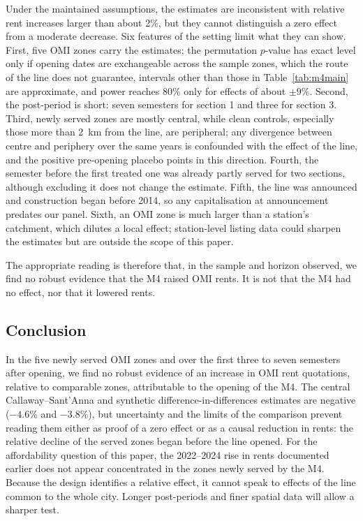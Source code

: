 Under the maintained assumptions, the estimates are inconsistent with relative rent increases larger than about 2\%, but they cannot distinguish a zero effect from a moderate decrease. Six features of the setting limit what they can show. First, five OMI zones carry the estimates; the permutation $p$-value has exact level only if opening dates are exchangeable across the sample zones, which the route of the line does not guarantee, intervals other than those in Table~\ref{tab:m4main} are approximate, and power reaches 80\% only for effects of about $\pm9\%$. Second, the post-period is short: seven semesters for section 1 and three for section 3. Third, newly served zones are mostly central, while clean controls, especially those more than 2~km from the line, are peripheral; any divergence between centre and periphery over the same years is confounded with the effect of the line, and the positive pre-opening placebo points in this direction. Fourth, the semester before the first treated one was already partly served for two sections, although excluding it does not change the estimate. Fifth, the line was announced and construction began before 2014, so any capitalisation at announcement predates our panel. Sixth, an OMI zone is much larger than a station's catchment, which dilutes a local effect; station-level listing data could sharpen the estimates but are outside the scope of this paper.

The appropriate reading is therefore that, in the sample and horizon observed, we find no robust evidence that the M4 raised OMI rents. It is not that the M4 had no effect, nor that it lowered rents.

\subsection*{Conclusion}

In the five newly served OMI zones and over the first three to seven semesters after opening, we find no robust evidence of an increase in OMI rent quotations, relative to comparable zones, attributable to the opening of the M4. The central Callaway--Sant'Anna and synthetic difference-in-differences estimates are negative ($-4.6\%$ and $-3.8\%$), but uncertainty and the limits of the comparison prevent reading them either as proof of a zero effect or as a causal reduction in rents: the relative decline of the served zones began before the line opened. For the affordability question of this paper, the 2022--2024 rise in rents documented earlier does not appear concentrated in the zones newly served by the M4. Because the design identifies a relative effect, it cannot speak to effects of the line common to the whole city. Longer post-periods and finer spatial data will allow a sharper test.
